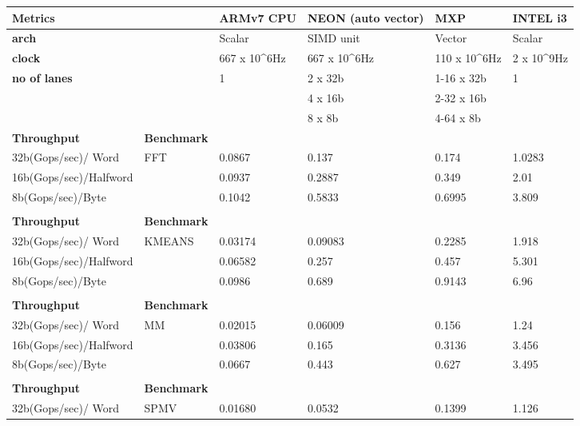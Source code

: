 \begin{table}[htbp]
	\centering
    	\begin{adjustbox}{width=.8\textwidth}
    	\small
	\begin{tabular}{llllll}
		\toprule
		\textbf{Metrics} &   & \textbf{ARMv7 CPU} & \textbf{NEON (auto vector)} & \textbf{MXP} & \textbf{INTEL i3} \\
		\midrule
		\textbf{arch} &   & Scalar & SIMD unit & Vector & Scalar \\
		\textbf{clock} &   & 667 x 10^{6}Hz & 667 x 10^{6}Hz & 110 x 10^{6}Hz & 2 x 10^{9}Hz \\
		\textbf{no of lanes} &   & 1 & 2 x 32b & 1-16 x 32b & 1 \\
		&   &   & 4 x 16b & 2-32 x 16b &  \\
		&   &   & 8 x 8b & 4-64 x 8b &  \\
		\midrule
		  \textbf{Throughput} & \textbf{Benchmark} &   &   &   &  \\
		\midrule
		  32b(Gops/sec)/ Word   & FFT & 0.0867 & 0.137 & 0.174 & 1.0283 \\
		  16b(Gops/sec)/Halfword &   & 0.0937 & 0.2887 & 0.349 & 2.01 \\
		  8b(Gops/sec)/Byte &   & 0.1042 & 0.5833 & 0.6995 & 3.809 \\
		    &   &   &   &   &  \\
		\midrule
		  \textbf{Throughput} & \textbf{Benchmark} &   &   &   &  \\
		\midrule
		  32b(Gops/sec)/ Word   & KMEANS & 0.03174 & 0.09083 & 0.2285 & 1.918 \\
		  16b(Gops/sec)/Halfword &   & 0.06582 & 0.257 & 0.457 & 5.301 \\
		  8b(Gops/sec)/Byte &   & 0.0986 & 0.689 & 0.9143 & 6.96 \\
		    &   &   &   &   &  \\
		\midrule
		  \textbf{Throughput} & \textbf{Benchmark} &   &   &   &  \\
		\midrule
		  32b(Gops/sec)/ Word   & MM & 0.02015 & 0.06009 & 0.156 & 1.24 \\
		  16b(Gops/sec)/Halfword &   & 0.03806 & 0.165 & 0.3136 & 3.456 \\
		  8b(Gops/sec)/Byte &   & 0.0667 & 0.443 & 0.627 & 3.495 \\
		    &   &   &   &   &  \\
		\midrule
		  \textbf{Throughput} & \textbf{Benchmark} &   &   &   &  \\
		\midrule
		  32b(Gops/sec)/ Word   & SPMV & 0.01680 & 0.0532 & 0.1399 & 1.126 \\

\end{tabular}
\end{adjustbox}
\end{table}
